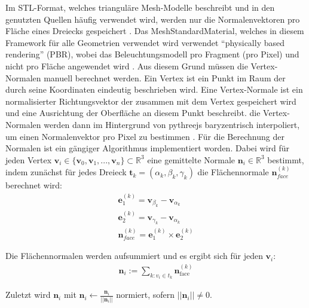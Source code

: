 Im STL-Format, welches trianguläre Mesh-Modelle beschreibt und in den genutzten Quellen häufig verwendet wird, werden nur die Normalenvektoren pro Fläche eines Dreiecks gespeichert .
Das MeshStandardMaterial, welches in diesem Framework für alle Geometrien verwendet wird verwendet \enquote{physically based rendering} (PBR),
wobei das Beleuchtungsmodell pro Fragment (pro Pixel) und nicht pro Fläche angewendet wird .
Aus diesem Grund müssen die Vertex-Normalen manuell berechnet werden.
Ein Vertex ist ein Punkt im Raum der durch seine Koordinaten eindeutig beschrieben wird.
Eine Vertex-Normale ist ein normalisierter Richtungsvektor der zusammen mit dem Vertex gespeichert wird und eine Ausrichtung der Oberfläche an diesem Punkt beschreibt.
die Vertex-Normalen werden dann im Hintergrund von pythreejs baryzentrisch interpoliert, um einen Normalenvektor pro Pixel zu bestimmen .
Für die Berechnung der Normalen ist ein gängiger Algorithmus implementiert worden.
Dabei wird für jeden Vertex $\mathbf{v}_i \in \{\mathbf{v}_0, \mathbf{v}_1,...,\mathbf{v}_n\} \subset \mathbb{R}^3$ eine gemittelte Normale $\mathbf{n}_i \in \mathbb{R}^3$ bestimmt,
indem zunächst für jedes Dreieck $\mathbf{t}_k = (\alpha_k,\beta_k,\gamma_k)$ die Flächennormale $\mathbf{n}^{(k)}_{face}$ berechnet wird:
\begin{align*}
    \mathbf{e}^{(k)}_1 = \mathbf{v}_{\beta_k} - \mathbf{v}_{\alpha_k}\\
    \mathbf{e}^{(k)}_2 = \mathbf{v}_{\gamma_k} - \mathbf{v}_{\alpha_k}\\
    \mathbf{n}^{(k)}_{face} = \mathbf{e}^{(k)}_1 \times \mathbf{e}^{(k)}_2
\end{align*}

Die Flächennormalen werden aufsummiert und es ergibt sich für jeden $\mathbf{v}_i$:
\begin{align*}
    \mathbf{n}_i := \sum_{k : v_i \in t_k} \mathbf{n}^{(k)}_{\text{face}} 
\end{align*}

Zuletzt wird $\mathbf{n}_i$ mit $\mathbf{n}_i \leftarrow \frac{\mathbf{n}_i}{||\mathbf{n}_i||}$ normiert, sofern $||\mathbf{n}_i|| \neq 0$.


